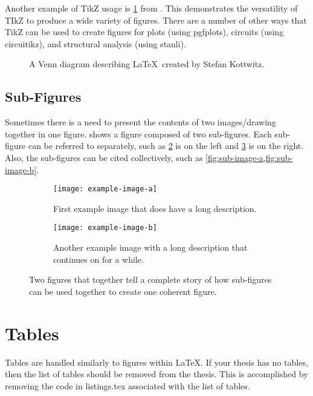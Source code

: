 Another example of TikZ usage is \cref{fig:tikz_venn} from \cite{kottwitz2015}.
This demonstrates the versatility of TIkZ to produce a wide variety of figures.
There are a number of other ways that TikZ can be used to create figures for plots (using pgfplots), circuits (using circuitikz), and structural analysis (using stanli).
\begin{figure}
	\centering
	
	\caption{A Venn diagram describing \LaTeX\ created by Stefan Kottwitz\cite{kottwitz2015}.}
	\label{fig:tikz_venn}
\end{figure}

\subsection{Sub-Figures}
Sometimes there is a need to present the contents of two images/drawing together in one figure.
 shows a figure composed of two sub-figures.
Each sub-figure can be referred to separately, such as \cref{fig:sub-image-a} is on the left and \cref{fig:sub-image-b} is on the right.
Also, the sub-figures can be cited collectively, such as \cref{fig:sub-image-a,fig:sub-image-b}.
\begin{figure}
	\centering
	\begin{subfigure}[t]{2.5in}
		\texttt{[image: example-image-a]}
		\caption{First example image that does have a long description.}
		\label{fig:sub-image-a}
	\end{subfigure}
	\hspace{0.2in}
	\begin{subfigure}[t]{2.5in}
		\texttt{[image: example-image-b]}
		\caption[size=normal]{Another example image with a long description that continues on for a while.}
		\label{fig:sub-image-b}
	\end{subfigure}
	\caption{Two figures that together tell a complete story of how sub-figures can be used together to create one coherent figure.}
	\label{fig:subfig-example}
\end{figure}

\section{Tables} \label{sec:Tables}
Tables are handled similarly to figures within \LaTeX.
If your thesis has no tables, then the list of tables should be removed from the thesis.
This is accomplished by removing the code in listings.tex associated with the list of tables.

